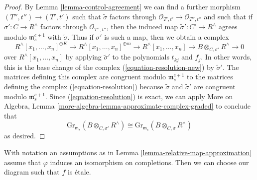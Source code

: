 \begin{proof}
\medskip\noindent
By Lemma \ref{lemma-control-agreement}
we can find a further morphism $(T'', t'') \to (T', t')$
such that $\tilde\sigma$
factors through $\mathcal{O}_{T', t'} \to \mathcal{O}_{T'', t''}$
and such that if $\sigma' : C \to R^\wedge$
factors through $\mathcal{O}_{T'', t''}$, then the induced map
$\tilde \sigma' : C' \to R^\wedge$
agrees modulo $\mathfrak m_s^{c + 1}$ with $\tilde \sigma$.
Thus if $\sigma'$ is such a map, then we obtain a complex
$$
R^\wedge[x_1, \ldots, x_n]^{\oplus K} \to
R^\wedge[x_1, \ldots, x_n]^{\oplus m} \to
R^\wedge[x_1, \ldots, x_n] \to B \otimes_{C, \sigma'} R^\wedge \to 0
$$
over $R^\wedge[x_1, \ldots, x_n]$ by applying $\tilde\sigma'$
to the polynomials $t_{kj}$ and $f_j$. In other words, this
is the base change of the complex (\ref{equation-resolution-new})
by $\tilde\sigma'$. The matrices defining this complex
are congruent modulo $\mathfrak m_s^{c + 1}$ to the matrices
defining the complex (\ref{equation-resolution}) because
$\tilde \sigma$ and $\tilde \sigma'$ are congruent modulo
$\mathfrak m_s^{c + 1}$. Since (\ref{equation-resolution}) is exact,
we can apply
More on Algebra, Lemma \ref{more-algebra-lemma-approximate-complex-graded}
to conclude that
$$
\text{Gr}_{\mathfrak m_s}(B \otimes_{C, \sigma'} R^\wedge)
\cong
\text{Gr}_{\mathfrak m_s}(B \otimes_{C, \sigma} R^\wedge)
$$
as desired.
\end{proof}

\begin{lemma}
\label{lemma-relative-isomorphism-approximation}
With notation an assumptions as in Lemma \ref{lemma-relative-map-approximation}
assume that $\varphi$ induces an isomorphism on completions.
Then we can choose our diagram such that $f$ is \'etale.
\end{lemma}

